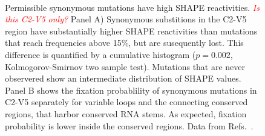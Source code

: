 \documentclass[rmp, twocolumn]{revtex4}
\newcommand{\comment}[1]{\textit{\textcolor{red}{#1}}}
\begin{document}
\begin{figure}
\begin{center}
\\
\caption{Permissible synonymous mutations have
high SHAPE reactivities. \comment{Is this C2-V5 only?} 
Panel A) Synonymous substitions in the C2-V5 region have substantially higher
SHAPE reactivities than mutations that reach frequencies above 15\%, but are
susequently lost. This difference is quantified by a cumulative histogram
($p=0.002$, Kolmogorov-Smirnov two sample test). Mutations that are never
observered show an intermediate distribution of SHAPE values.
Panel B shows the fixation probablility of synonymous mutations in C2-V5
separately for variable loops and the connecting conserved regions, that
harbor conserved RNA stems. As expected, fixation probability is lower inside
the conserved regions. Data from Refs.~\cite{shankarappa_consistent_1999,
bunnik_autologous_2008, liu_selection_2006}.}
\label{fig:SHAPE}
\end{center}
\end{figure}
\end{document}
